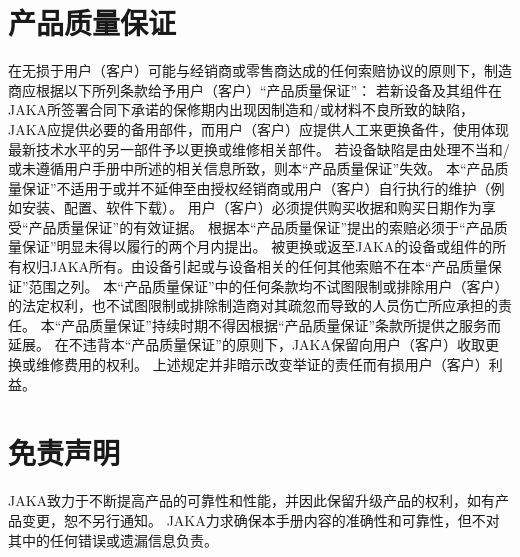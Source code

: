 \documentclass[a4paper,11pt,english,openany,oneside]{sphinxmanual}
\let\origlistoffigures\listoffigures
\renewcommand{\listoffigures}{
    \begingroup
    \hypersetup{linkcolor=black}
    \origlistoffigures
    \endgroup
}
\let\origlistoftables\listoftables
\renewcommand{\listoftables}{
    \begingroup
    \hypersetup{linkcolor=black}
    \origlistoftables
    \endgroup
}
\begin{document}
\section{产品质量保证}
\label{\detokenize{11 _u8d28_u91cf_u4fdd_u969c:id2}}
\sphinxAtStartPar
在无损于用户（客户）可能与经销商或零售商达成的任何索赔协议的原则下，制造商应根据以下所列条款给予用户（客户）“产品质量保证”：
若新设备及其组件在JAKA所签署合同下承诺的保修期内出现因制造和/或材料不良所致的缺陷，
JAKA应提供必要的备用部件，而用户（客户）应提供人工来更换备件，使用体现最新技术水平的另一部件予以更换或维修相关部件。
若设备缺陷是由处理不当和/或未遵循用户手册中所述的相关信息所致，则本“产品质量保证”失效。
本“产品质量保证”不适用于或并不延伸至由授权经销商或用户（客户）自行执行的维护（例如安装、配置、软件下载）。
用户（客户）必须提供购买收据和购买日期作为享受“产品质量保证”的有效证据。
根据本“产品质量保证”提出的索赔必须于“产品质量保证”明显未得以履行的两个月内提出。
被更换或返至JAKA的设备或组件的所有权归JAKA所有。由设备引起或与设备相关的任何其他索赔不在本“产品质量保证”范围之列。
本“产品质量保证”中的任何条款均不试图限制或排除用户（客户）的法定权利，也不试图限制或排除制造商对其疏忽而导致的人员伤亡所应承担的责任。
本“产品质量保证”持续时期不得因根据“产品质量保证”条款所提供之服务而延展。
在不违背本“产品质量保证”的原则下，JAKA保留向用户（客户）收取更换或维修费用的权利。
上述规定并非暗示改变举证的责任而有损用户（客户）利益。


\section{免责声明}
\label{\detokenize{11 _u8d28_u91cf_u4fdd_u969c:id3}}
\sphinxAtStartPar
JAKA致力于不断提高产品的可靠性和性能，并因此保留升级产品的权利，如有产品变更，恕不另行通知。
JAKA力求确保本手册内容的准确性和可靠性，但不对其中的任何错误或遗漏信息负责。

\clearpage
\listoffigures
\clearpage
\listoftables



\renewcommand{\indexname}{索引}
\printindex
\end{document}
